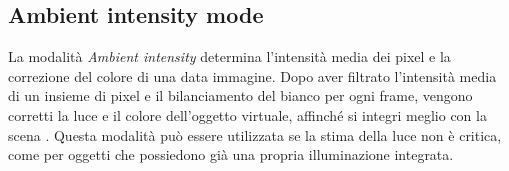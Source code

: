 \documentclass[crop=false, class=book]{standalone}
\begin{document}
	\subsection{Ambient intensity mode}
		La modalità \textit{Ambient intensity} determina l'intensità media dei pixel e la correzione del colore di una data immagine. Dopo aver filtrato l'intensità media di un insieme di pixel e il bilanciamento del bianco per ogni frame, vengono corretti la luce e il colore dell'oggetto virtuale, affinché si integri meglio con la scena \cite{suonsivu2020rgbd}. Questa modalità può essere utilizzata se la stima della luce non è critica, come per oggetti che possiedono già una propria illuminazione integrata.
	
	
\end{document}
